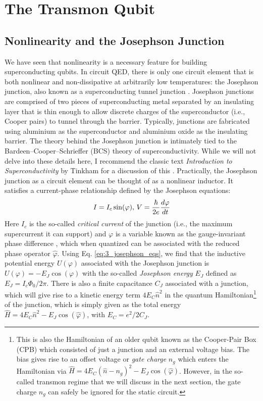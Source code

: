 \section{The Transmon Qubit}

\subsection{Nonlinearity and the Josephson Junction}

We have seen that nonlinearity is a necessary feature for building superconducting qubits. In circuit QED, there is only one circuit element that is both nonlinear and non-dissipative at arbitrarily low temperatures: the Josephson junction, also known as a superconducting tunnel junction \cite{devoret2004superconducting}. Josephson junctions are comprised of two pieces of superconducting metal separated by an insulating layer that is thin enough to allow discrete charges of the superconductor (i.e., Cooper pairs) to tunnel through the barrier. Typically,  junctions are fabricated using aluminium as the superconductor and aluminium oxide as the insulating barrier. The theory behind the Josephson junction is intimately tied to the Bardeen–Cooper–Schrieffer (BCS) theory of superconductivity. While we will not delve into these details here, I recommend the classic text \textit{Introduction to Superconductivity} by Tinkham for a discussion of this \cite{tinkham2004introduction}. Practically, the Josephson junction as a circuit element can be thought of as a nonlinear inductor. It satisfies a current-phase relationship defined by the Josephson equations:
\begin{equation}
    I = I_c \sin(\varphi), \, V = \frac{\hbar}{2e}\frac{d\varphi}{dt}
    \label{eq:3_josephson_eqs}
\end{equation}
Here $I_c$ is the so-called \textit{critical current} of the junction (i.e., the maximum supercurrent it can support) and $\varphi$ is a variable known as the gauge-invariant phase difference \cite{devoret2021does}, which when quantized can be associated with the reduced phase operator $\hat{\varphi}$. Using Eq. \eqref{eq:3_josephson_eqs}, we find that the inductive potential energy $U(\varphi)$ associated with the Josephson junction is $U(\varphi) = -E_J\cos(\varphi)$ with the so-called \textit{Josephson energy} $E_J$ defined as $E_J = I_c\Phi_0/2\pi$. There is also a finite capacitance $C_J$ associated with a junction, which will give rise to a kinetic energy term $4E_C\hat{n}^2$ in the quantum Hamiltonian\footnote{This is also the Hamiltonian of an older qubit known as the Cooper-Pair Box (CPB) which consisted of just a junction and an external voltage bias. The bias gives rise to an offset voltage or \textit{gate charge} $n_g$ which enters the Hamiltonian via $\hat{H} = 4E_C(\hat{n}-n_g)^2 - E_J\cos(\hat{\varphi})$. However, in the so-called transmon regime that we will discuss in the next section, the gate charge $n_g$ can safely be ignored for the static circuit. } of the junction, which is simply given as the total energy $\hat{H} = 4E_C\hat{n}^2 - E_J\cos(\hat{\varphi})$, with $E_C = e^2/2C_J$. 

